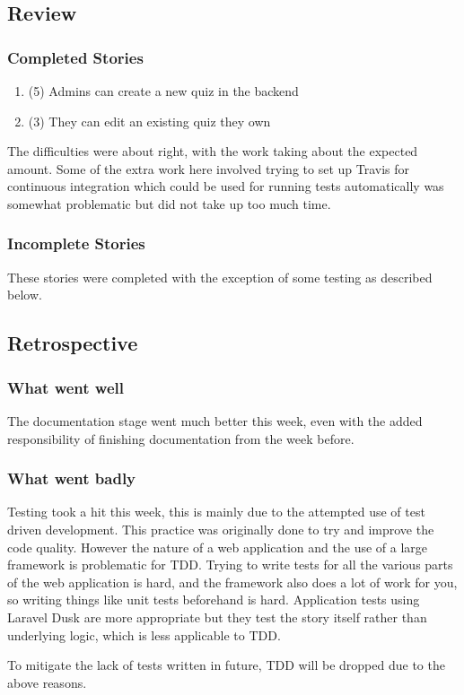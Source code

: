 \subsection{Review}
\subsubsection{Completed Stories}
\begin{enumerate}
	\item (5) Admins can create a new quiz in the backend
	\item (3) They can edit an existing quiz they own
\end{enumerate}
The difficulties were about right, with the work taking about the expected amount. Some of the extra work here involved trying to set up Travis for continuous integration which could be used for running tests automatically was somewhat problematic but did not take up too much time.
\subsubsection{Incomplete Stories}
These stories were completed with the exception of some testing as described below.

\subsection{Retrospective}
\subsubsection{What went well}
The documentation stage went much better this week, even with the added responsibility of finishing documentation from the week before.
\subsubsection{What went badly}
Testing took a hit this week, this is mainly due to the attempted use of test driven development. This practice was originally done to try and improve the code quality. However the nature of a web application and the use of a large framework is problematic for TDD. Trying to write tests for all the various parts of the web application is hard, and the framework also does a lot of work for you, so writing things like unit tests beforehand is hard. Application tests using Laravel Dusk are more appropriate but they test the story itself rather than underlying logic, which is less applicable to TDD. 

To mitigate the lack of tests written in future, TDD will be dropped due to the above reasons.
\newpage
